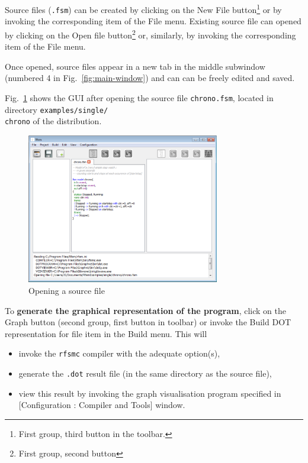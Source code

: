 Source files (\verb|.fsm|) can be created by clicking on the \textsf{New File} button\footnote{First
  group, third button in the toolbar.} or by invoking the corresponding item of the \textsf{File}
menu. Existing source file can opened by clicking on the \textsf{Open file} button\footnote{First
  group, second button} or, similarly, by invoking the corresponding item of the \textsf{File} menu.

Once opened, source files appear in a new tab in the middle subwindow (numbered 4 in
Fig.~\ref{fig:main-window}) and can can be freely edited and saved. 

Fig.~\ref{fig:open-file} shows the GUI after
opening the source file \verb|chrono.fsm|, located in directory \texttt{examples/single/\\chrono} of
the distribution.

\begin{figure}[h]
  \centering
  \includegraphics[width=0.75\textwidth]{figs/gui/open-file}
  \caption{Opening a source file}
  \label{fig:open-file}
\end{figure}

\medskip
To \textbf{generate the graphical representation of the program}, click on the \textsf{Graph} button
(second group, first button in toolbar) or invoke the \textsf{Build DOT representation for file}
item in the \textsf{Build} menu. This will
\begin{itemize}
\item invoke the \verb|rfsmc| compiler with the adequate option(s),
\item generate the \texttt{.dot} result file (in the same directory as the source file),
\item view this result by invoking the graph visualisation program specified in 
  [\textsf{Configuration : Compiler and Tools}] window.
\end{itemize}

